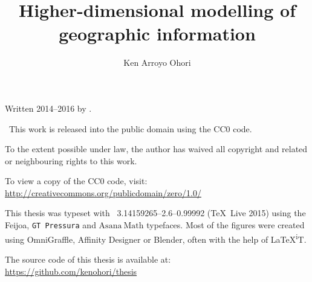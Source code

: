 
% 

\author{Ken Arroyo Ohori}
\title{Higher-dimensional modelling of geographic information}
\date{}
\maketitle

\clearpage
\thispagestyle{empty}
\null%
\label{thesis:colophon}
\vfill
{}
Written 2014--2016 by
{\makeatletter
\href{http://ken.mx}{\@author}%
\makeatother}.

\cczero\ This work is released into the public domain using the CC0 code.

To the extent possible under law, the author has waived all copyright and related or neighbouring rights to this work.

To view a copy of the CC0 code, visit: \\
\url{http://creativecommons.org/publicdomain/zero/1.0/}

This thesis was typeset with \XeTeX\ 3.14159265--2.6--0.99992 (\TeX\ Live 2015) using the \mbox{{\fanciestfont{}Feijoa}}, \texttt{GT Pressura} and $\mathrm{Asana\ Math}$ typefaces.
Most of the figures were created using OmniGraffle, Affinity Designer or Blender, often with the help of \LaTeX{}\textsuperscript{i}T.

The source code of this thesis is available at: \\
\url{https://github.com/kenohori/thesis}

